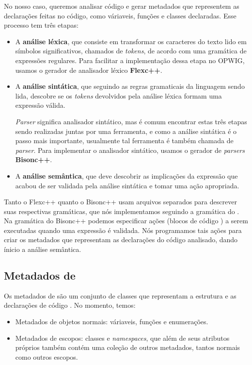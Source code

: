   No nosso caso, queremos analisar código \CXX{} e gerar metadados que representem as declarações feitas no
  código, como váriaveis, funções e classes declaradas. Esse processo tem três etapas:
  \begin{itemize}
    \item A \textbf{análise léxica}, que consiste em transformar os caracteres do texto lido em símbolos 
      significativos, chamados de \textit{tokens}, de acordo com uma gramática de expressões regulares. 
      Para facilitar a implementação dessa etapa no OPWIG, usamos o gerador de analisador léxico
      \textbf{Flexc++}\cite{flex:00}.
      
    \item A \textbf{análise sintática}, que seguindo as regras gramaticais da linguagem sendo lida, 
      descobre se os \textit{tokens} devolvidos pela análise léxica formam uma expressão válida.
      
      \textit{Parser} significa analisador sintático, mas é comum encontrar estas três etapas sendo
      realizadas juntas por uma ferramenta, e como a análise sintática é o passo mais importante, usualmente
      tal ferramenta é também chamada de \textit{parser}. Para implementar o analisador sintático,
      usamos o gerador de \textit{parsers} \textbf{Bisonc++}\cite{bison:00}.
      
    \item A \textbf{análise semântica}, que deve descobrir as implicações da expressão que acabou de ser
      validada pela análise sintática e tomar uma ação apropriada.
  \end{itemize}
  
  Tanto o Flexc++ quanto o Bisonc++ usam arquivos separados para descrever suas respectivas gramáticas, que
  nós implementamos seguindo a gramática do \CXX{}. Na gramática do Bisonc++ podemos especificar ações
  (blocos de código \CXX{}) a serem executadas quando uma expressão é validada. Nós programamos tais ações
  para criar os metadados que representam as declarações do código \CXX{} analisado, dando ínicio a 
  análise semântica.
  
  \subsection{Metadados de \CXX{}}
  Os metadados de \CXX{} são um conjunto de classes que representam a estrutura e as declarações de
  código \CXX{}. No momento, temos:
  \begin{itemize}
    \item Metadados de objetos normais: váriaveis, funções e enumerações.
    \item Metadados de escopos: classes e \textit{namespaces}, que além de seus atributos próprios
      também contém uma coleção de outros metadados, tantos normais como outros escopos.
  \end{itemize}
  

